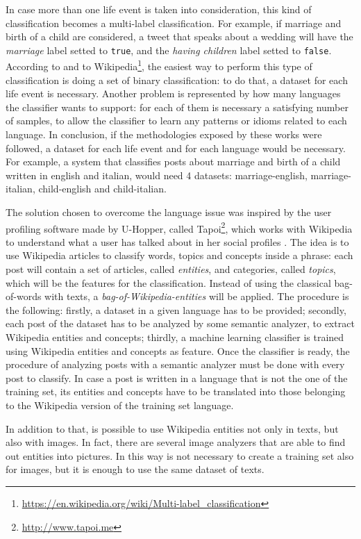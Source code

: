 In case more than one life event is taken into consideration, this kind of classification becomes a multi-label classification. For example, if marriage and birth of a child are considered, a tweet that speaks about a wedding will have the \textit{marriage} label setted to \texttt{true}, and the \textit{having children} label setted to \texttt{false}. According to \cite{cavalinclassification} and to Wikipedia\footnote{\url{https://en.wikipedia.org/wiki/Multi-label_classification}}, the easiest way to perform this type of classification is doing a set of binary classification: to do that, a dataset for each life event is necessary. Another problem is represented by how many languages the classifier wants to support: for each of them is necessary a satisfying number of samples, to allow the classifier to learn any patterns or idioms related to each language. In conclusion, if the methodologies exposed by these works were followed, a dataset for each life event and for each language would be necessary. For example, a system that classifies posts about marriage and birth of a child written in english and italian, would need 4 datasets: marriage-english, marriage-italian, child-english and child-italian.

The solution chosen to overcome the language issue was inspired by the user profiling software made by U-Hopper, called Tapoi\footnote{\url{http://www.tapoi.me}}, which works with Wikipedia to understand what a user has talked about in her social profiles \cite{torrero2018wikipedia}. The idea is to use Wikipedia articles to classify words, topics and concepts inside a phrase: each post will contain a set of articles, called \textit{entities}, and categories, called \textit{topics}, which will be the features for the classification. Instead of using the classical bag-of-words with texts, a \textit{bag-of-Wikipedia-entities} will be applied. The procedure is the following: firstly, a dataset in a given language has to be provided; secondly, each post of the dataset has to be analyzed by some semantic analyzer, to extract Wikipedia entities and concepts; thirdly, a machine learning classifier is trained using Wikipedia entities and concepts as feature. Once the classifier is ready, the procedure of analyzing posts with a semantic analyzer must be done with every post to classify. In case a post is written in a language that is not the one of the training set, its entities and concepts have to be translated into those belonging to the Wikipedia version of the training set language.

In addition to that, is possible to use Wikipedia entities not only in texts, but also with images. In fact, there are several image analyzers that are able to find out entities into pictures. In this way is not necessary to create a training set also for images, but it is enough to use the same dataset of texts.

